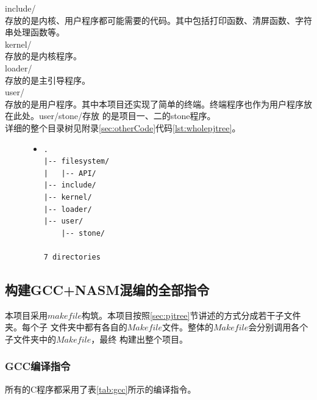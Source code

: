 \documentclass[a4paper]{article}
\begin{document}
    include/\\
    存放的是内核、用户程序都可能需要的代码。其中包括打印函数、清屏函数、字符串处理函数等。\\
    
    kernel/\\
    存放的是内核程序。\\
    
    loader/\\
    存放的是主引导程序。\\
    
    user/\\
    存放的是用户程序。其中本项目还实现了简单的终端。终端程序也作为用户程序放在此处。user/stone/存放
    的是项目一、二的stone程序。\\
    
    详细的整个目录树见附录\ref{sec:otherCode}代码\ref{lst:wholepjtree}。
    \begin{figure}[!hbt]
    \begin{itemize}
    \item[] \begin{lstlisting}[label=lst:pjtree, caption=项目目录树介绍(仅文件夹)]
.
|-- filesystem/
|   |-- API/
|-- include/
|-- kernel/
|-- loader/
|-- user/
    |-- stone/

7 directories
    \end{lstlisting}
    \end{itemize}
    \end{figure}
    \subsection{构建GCC+NASM混编的全部指令}
    本项目采用$makefile$构筑。本项目按照\ref{sec:pjtree}节讲述的方式分成若干子文件夹。每个子
    文件夹中都有各自的$Makefile$文件。整体的$Makefile$会分别调用各个子文件夹中的$Makefile$，最终
    构建出整个项目。
    \subsubsection{GCC编译指令} \label{subsec:gccCompileIns}
    所有的C程序都采用了表\ref{tab:gcc}所示的编译指令。
\end{document}
